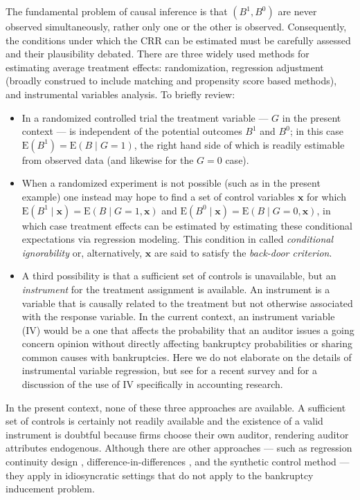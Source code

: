 \documentclass[aoas,preprint, 11pt, dvipsnames, table, x11name]{imsart}
\newcommand{\E}{\mbox{E}}
\theoremstyle{remark}
\begin{document}
	The fundamental problem of causal inference \citep{Holland-1986} is that $(B^1, B^0)$ are never observed simultaneously, rather only one or the other is observed. Consequently, the conditions under which the CRR can be estimated must be carefully assessed and their plausibility debated. There are three widely used methods for estimating average treatment effects: randomization, regression adjustment (broadly construed to include matching and propensity score based methods), and instrumental variables analysis. To briefly review:
	\begin{itemize}
		\item In a randomized controlled trial the treatment variable --- $G$ in the present context --- is independent of the potential outcomes $B^1$ and $B^0$; in this case $\E(B^1) = \E(B \mid G = 1)$, the right hand side of which is readily estimable from observed data (and likewise for the $G = 0$ case). 
		
		\item When a randomized experiment is not possible (such as in the present example) one instead may hope to find a set of control variables $\mathbf{x}$ for which $\E(B^1 \mid \mathbf{x}) = \E(B \mid G = 1, \mathbf{x})$ and $\E(B^0 \mid \mathbf{x}) = \E(B \mid G = 0, \mathbf{x})$, in which case treatment effects can be estimated by estimating these conditional expectations via regression modeling. This condition in called {\em conditional ignorability} or, alternatively, $\mathbf{x}$ are said to satisfy the {\em back-door criterion}. 
		
		\item A third possibility is that a sufficient set of controls is unavailable, but an {\em instrument} for the treatment assignment is available. An instrument is a variable that is causally related to the treatment but not otherwise associated with the response variable. In the current context, an instrument variable (IV) would be a one that affects the probability that an auditor issues a going concern opinion without directly affecting bankruptcy probabilities or sharing common causes with bankruptcies. 
		Here we do not elaborate on the details of instrumental variable regression, but see \cite{imbens2014instrumental} for a recent survey and \cite{larcker2010use} for a discussion of the use of IV specifically in accounting research.
	\end{itemize}
	In the present context, none of these three approaches are available. A sufficient set of controls is certainly not readily available and the existence of a valid instrument is doubtful because firms choose their own auditor, rendering auditor attributes endogenous. Although there are other approaches --- such as regression continuity design \citep{Imbens-rdd, Thistlethwaite-rdd}, difference-in-differences \citep{card1994}, and the synthetic control method \citep{abadie2010, abadie2003} --- they apply in idiosyncratic settings that do not apply to the bankruptcy inducement problem. 
	
\end{document}
